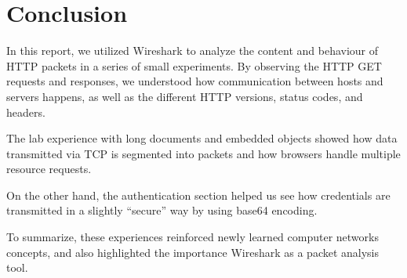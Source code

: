 
\section*{Conclusion}

In this report, we utilized Wireshark to analyze the content and behaviour of
HTTP packets in a series of small experiments. By observing the HTTP GET
requests and responses, we understood how communication between hosts and
servers happens, as well as the different HTTP versions, status codes, and
headers.

The lab experience with long documents and embedded objects showed how data
transmitted via TCP is segmented into packets and how browsers handle multiple
resource requests.

On the other hand, the authentication section helped us see how credentials are
transmitted in a slightly ``secure'' way by using base64 encoding.

To summarize, these experiences reinforced newly learned computer networks
concepts, and also highlighted the importance Wireshark as a packet analysis
tool.


%